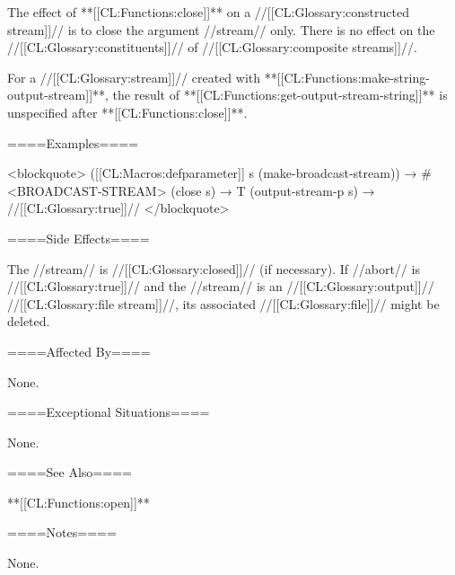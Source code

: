 The effect of **[[CL:Functions:close]]** on a //[[CL:Glossary:constructed stream]]// is to close the argument //stream// only. There is no effect on the //[[CL:Glossary:constituents]]// of //[[CL:Glossary:composite streams]]//.

For a //[[CL:Glossary:stream]]// created with **[[CL:Functions:make-string-output-stream]]**, the result of **[[CL:Functions:get-output-stream-string]]** is unspecified after **[[CL:Functions:close]]**.


====Examples====

<blockquote> ([[CL:Macros:defparameter]] s (make-broadcast-stream)) → #<BROADCAST-STREAM> (close s) → T (output-stream-p s) → //[[CL:Glossary:true]]// </blockquote>

====Side Effects====

The //stream// is //[[CL:Glossary:closed]]// (if necessary). If //abort// is //[[CL:Glossary:true]]// and the //stream// is an //[[CL:Glossary:output]]// //[[CL:Glossary:file stream]]//, its associated //[[CL:Glossary:file]]// might be deleted.

====Affected By====

None.

====Exceptional Situations====

None.

====See Also====

**[[CL:Functions:open]]**

====Notes====

None.

   
